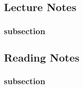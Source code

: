 \documentclass[11pt]{scrartcl} %
\begin{document}
\subsection{Lecture Notes}

\subsubsection{subsection}
\textbf{}

\subsection{Reading Notes}

\subsubsection{subsection}
\textbf{}

\end{document}
